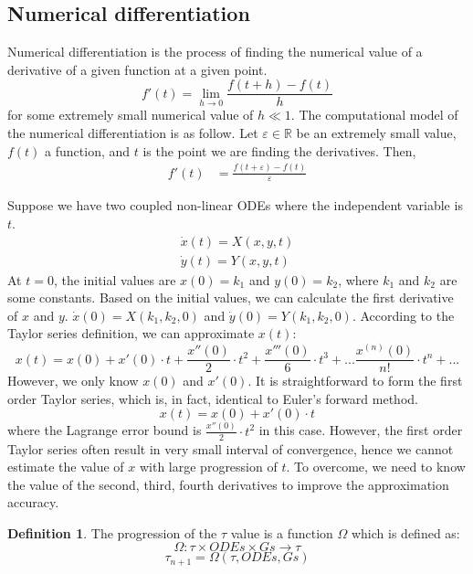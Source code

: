 \documentclass[twoside,a4paper,12pt]{article}
\theoremstyle{definition}
\newtheorem{definition}{Definition}
\begin{document}
\subsection{Numerical differentiation}
Numerical differentiation is the process of finding the numerical value of a derivative of a given function at a given point.
\begin{equation}
f'(t) = \lim\limits_{h\rightarrow 0} \frac{f(t+h)-f(t)}{h}
\end{equation}
for some extremely small numerical value of $h \ll 1$.
The computational model of the numerical differentiation is as follow.
Let $\varepsilon \in \mathbb{R}$ be an extremely small value, $f(t)$ a function, and $t$ is the point we are finding the derivatives. Then,
\begin{align}
f'(t) &= \frac{f(t+\varepsilon)-f(t)}{\varepsilon}
\end{align}



Suppose we have two coupled non-linear ODEs where the independent variable is $t$.
\begin{gather}
	\dot{x}(t) = X(x,y,t) \\
	\dot{y}(t) = Y(x,y,t) 
\end{gather}
At $t=0$, the initial values are $x(0) = k_1$ and $y(0) = k_2$, where $k_1$ and $k_2$ are some constants.
Based on the initial values, we can calculate the first derivative of $x$ and $y$. $\dot{x}(0) = X(k_1, k_2, 0)$ and $\dot{y}(0) = Y(k_1, k_2, 0)$.
According to the Taylor series definition, we can approximate $x(t)$:
\begin{equation}
	x(t) = x(0) + x'(0) \cdot t + \frac{x''(0)}{2}\cdot t^2 + \frac{x'''(0)}{6}  \cdot t^3 + ... \frac{x^{(n)}(0)}{n!} \cdot t^n + ... 
\end{equation}
However, we only know $x(0)$ and $x'(0)$. It is straightforward to form the first order Taylor series, which is, in fact, identical to Euler's forward method.
\begin{equation}
	x(t) = x(0) + x'(0) \cdot t
\end{equation}
where the Lagrange error bound is $\frac{x''(0)}{2}\cdot t^2$ in this case.
However, the first order Taylor series often result in very small interval of convergence, hence we cannot estimate the value of $x$ with large progression of $t$.
To overcome, we need to know the value of the second, third, fourth derivatives to improve the approximation accuracy.









\begin{definition}
	The progression of the $\tau$ value is a function $\Omega$ which is defined as:
	\begin{equation}
			\Omega : \tau \times ODEs \times Gs \rightarrow \tau
	\end{equation}
	$$ \tau_{n+1} = \Omega(\tau, ODEs, Gs) $$
\end{definition}
\end{document}
